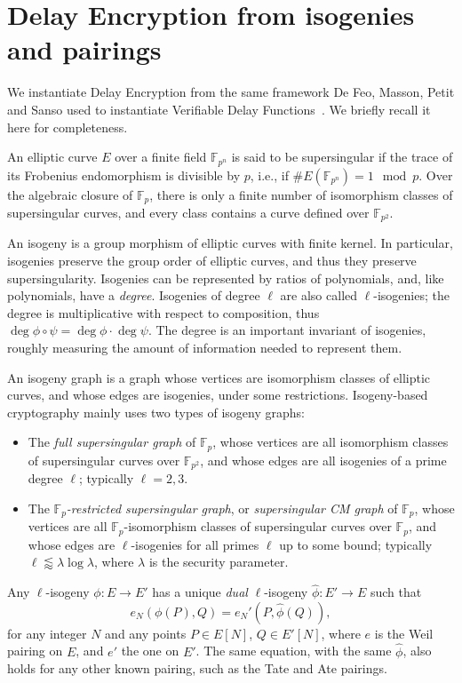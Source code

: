 \documentclass{llncs}
\newcommand{\F}{\mathbb{F}}
\begin{document}
\section{Delay Encryption from isogenies and pairings}
\label{sec:delay-encrypt-from}

We instantiate Delay Encryption from the same framework De Feo,
Masson, Petit and Sanso used to instantiate Verifiable Delay
Functions~\cite{10.1007/978-3-030-34578-5_10}. %
We briefly recall it here for completeness.

An elliptic curve $E$ over a finite field $\F_{p^n}$ is said to be
supersingular if the trace of its Frobenius endomorphism is divisible
by $p$, i.e., if $\#E(\F_{p^n})=1\mod p$. %
Over the algebraic closure of $\F_p$, there is only a finite number of
isomorphism classes of supersingular curves, and every class contains
a curve defined over $\F_{p^2}$.

An isogeny is a group morphism of elliptic curves with finite
kernel. %
In particular, isogenies preserve the group order of elliptic curves,
and thus they preserve supersingularity. %
Isogenies can be represented by ratios of polynomials, and, like
polynomials, have a \emph{degree}. %
Isogenies of degree $\ell$ are also called $\ell$-isogenies; the
degree is multiplicative with respect to composition, thus
$\deg\phi\circ\psi=\deg\phi\cdot\deg\psi$. %
The degree is an important invariant of isogenies, roughly measuring
the amount of information needed to represent them.

An isogeny graph is a graph whose vertices are isomorphism classes of
elliptic curves, and whose edges are isogenies, under some
restrictions. %
Isogeny-based cryptography mainly uses two types of isogeny graphs:
\begin{itemize}
\item The \emph{full supersingular graph} of $\F_p$, whose vertices
  are all isomorphism classes of supersingular curves over $\F_{p^2}$,
  and whose edges are all isogenies of a prime degree $\ell$;
  typically $\ell=2,3$.
\item The \emph{$\F_p$-restricted supersingular graph}, or
  \emph{supersingular CM graph} of $\F_p$, whose vertices are all
  $\F_p$-isomorphism classes of supersingular curves over $\F_p$, and
  whose edges are $\ell$-isogenies for all primes $\ell$ up to some
  bound; typically $\ell\lessapprox\lambda\log\lambda$, where
  $\lambda$ is the security parameter.
\end{itemize}

Any $\ell$-isogeny $\phi:E\to E'$ has a unique \emph{dual}
$\ell$-isogeny $\hat\phi:E'\to E$ such that
\begin{equation}
  \label{eq:adjoin}
  e_N(\phi(P),Q) = e_N'(P,\hat\phi(Q)),
\end{equation}
for any integer $N$ and any points $P\in E[N]$, $Q\in E'[N]$, where
$e$ is the Weil pairing on $E$, and $e'$ the one on $E'$. %
The same equation, with the same $\hat\phi$, also holds for any other
known pairing, such as the Tate and Ate pairings.
\end{document}
